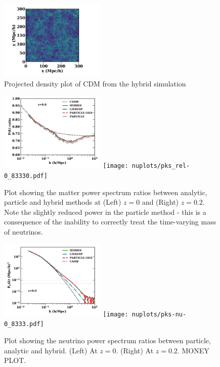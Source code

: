 \documentclass[useAMS, usenatbib]{mnras}
\begin{document}
\begin{figure}
\includegraphics[width=0.45\textwidth]{nuplots/dens-plt-b300p512nu0_4hybt1.pdf}
  \caption{Projected density plot of CDM from the hybrid simulation}
  \label{fig:cdm_density_plot}
\end{figure}

\begin{figure}
\includegraphics[width=0.45\textwidth]{nuplots/pks_rel-10.pdf}
\texttt{[image: nuplots/pks\_rel-0\_83330.pdf]}
  \caption{Plot showing the matter power spectrum ratios between analytic, particle and hybrid methods at (Left) $z=0$ and (Right) $z=0.2$. Note the slightly reduced power in the particle method - this is a consequence of the inability to correctly treat the time-varying mass of neutrinos.
  }
  \label{fig:matter_power}
\end{figure}

\begin{figure}
\includegraphics[width=0.45\textwidth]{nuplots/pks-nu-1.pdf}
\texttt{[image: nuplots/pks-nu-0\_8333.pdf]}
  \caption{Plot showing the neutrino power spectrum ratios between particle, analytic and hybrid.
  (Left) At $z=0$. (Right) At $z=0.2$.
  MONEY PLOT.}
  \label{fig:neutrino_power}
\end{figure}
\end{document}
